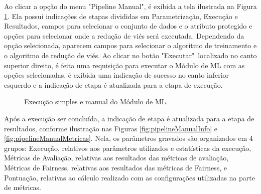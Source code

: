 \documentclass[portugues]{ic-tese}
\begin{document}
Ao clicar a opção do menu "Pipeline Manual", é exibida a tela ilustrada na Figura \ref{fig:pipelineManual}. Ela possui indicações de etapas divididas em Parametrização, Execução e Resultados, campos para selecionar o conjunto de dados e o atributo protegido e opções para selecionar onde a redução de viés será executada. Dependendo da opção selecionada, aparecem campos para selecionar o algoritmo de treinamento e o algoritmo de redução de viés. Ao clicar no botão "Executar"~localizado no canto superior direito, é feita uma requisição para executar o Módulo de ML com as opções selecionadas, é exibida uma indicação de sucesso no canto inferior esquerdo e a indicação de etapa é atualizada para a etapa de execução.

\begin{figure}[H]
    \centering
    \caption{Execução simples e manual do Módulo de ML.}
    \label{fig:pipelineManual}
\end{figure}

Após a execução ser concluída,  a indicação de etapa é atualizada para a etapa de resultados, conforme ilustração nas Figuras \ref{fig:pipelineManualInfo} e \ref{fig:pipelineManualMetricas}. Nela, os parâmetros gravados são organizados em 4 grupos: Execução, relativos aos parâmetros utilizados e estatísticas da execução, Métricas de Avaliação, relativas aos resultados das métricas de avaliação, Métricas de Fairness, relativas aos resultados das métricas de Fairness, e Pontuação, relativas ao cálculo realizado com as configurações utilizadas na parte de métricas.
\end{document}

